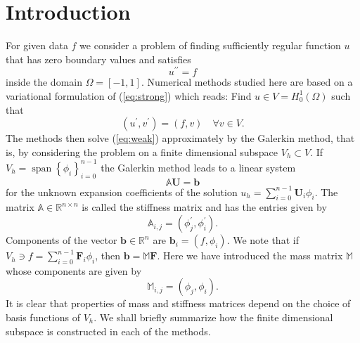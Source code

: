 \documentclass[a4paper,10pt]{article}
\newcommand{\R}{\ensuremath{\mathbb{R}}}
\newcommand{\inner}[2]{\ensuremath{\left(#1, #2\right)}}
\newcommand{\Amat}{\ensuremath{\mathbb{A}}}
\newcommand{\Mmat}{\ensuremath{\mathbb{M}}}
\newcommand{\Uvec}{\ensuremath{\mathbf{U}}}
\newcommand{\bvec}{\ensuremath{\mathbf{b}}}
\DeclareMathOperator{\spn}{span}
\begin{document}
\section{Introduction}
  For given data $f$ we consider a problem of finding sufficiently regular
  function $u$ that has zero boundary values and satisfies
  \begin{equation}
    \label{eq:strong}
    u^{\prime\prime} = f
  \end{equation}
  inside the domain $\Omega=\left[-1, 1\right]$. Numerical methods studied here
  are based on a variational formulation of (\ref{eq:strong}) which reads: Find
  $u\in V=H^1_0(\Omega)$ such that
  \begin{equation}
    \label{eq:weak}
    \inner{u^{\prime}}{v^{\prime}} = \inner{f}{v}\quad\forall v\in V.
  \end{equation}
  The methods then solve (\ref{eq:weak}) approximately by the Galerkin method,
  that is, by considering the problem on a finite dimensional subspace
  $V_h\subset V$. If $V_h=\spn\left\{\phi_i\right\}_{i=0}^{n-1}$ the Galerkin
  method leads to a linear system
  \[
    \Amat\Uvec = \bvec
  \]
  for the unknown expansion coefficients of the solution
  $u_h=\sum_{i=0}^{n-1}\Uvec_i \phi_i$. The matrix $\Amat\in\R^{n\times n}$ is
  called the stiffness matrix and has the entries given by
  \[
    \Amat_{i, j} = \inner{\phi_j^{\prime}}{\phi_i^{\prime}}.
  \]
  Components of the vector $\bvec\in\R^n$ are $\bvec_i=\inner{f}{\phi_i}$. We
  note that if $V_h\ni f=\sum_{i=0}^{n-1}\mathbf{F}_i \phi_i$, then
  $\bvec=\Mmat\mathbf{F}$. Here we have introduced the mass matrix $\Mmat$ whose
  components are given by
  \[
    \Mmat_{i, j} = \inner{\phi_j}{\phi_i}.
  \]
  It is clear that properties of mass and stiffness matrices depend on the
  choice of basis functions of $V_h$. We shall briefly summarize how the finite
  dimensional subspace is constructed in each of the methods.
\end{document}
